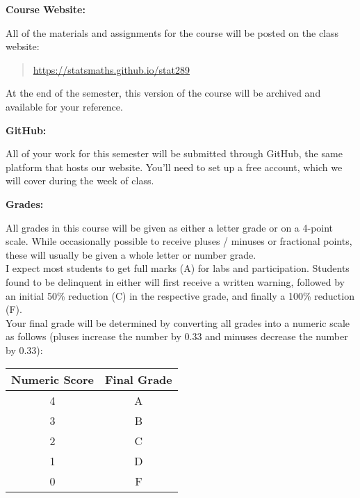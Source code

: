 \documentclass[12pt]{article}
\begin{document}
\vspace{0.4cm}

\textbf{Course Website:} \vspace{6pt}

All of the materials and assignments for the course will be posted
on the class website:
\begin{quote}
\url{https://statsmaths.github.io/stat289}
\end{quote}
At the end of the semester, this version of the course
will be archived and available for your reference.

\newpage

\vspace{0.4cm}

\textbf{GitHub:} \vspace{6pt}

All of your work for this semester will be submitted through GitHub,
the same platform that hosts our website. You'll need to set up a free
account, which we will cover during the week of class.

\vspace{0.4cm}

\textbf{Grades:} \vspace{6pt}

All grades in this course will be given as either a letter grade
or on a 4-point scale.
While occasionally possible to receive pluses / minuses or
fractional points, these will usually be given a whole letter or
number grade. \\

I expect most students to get full marks (A) for labs and participation.
Students found to be delinquent in either will first receive a written
warning, followed by an initial 50\% reduction (C) in the respective grade,
and finally a 100\% reduction (F). \\

Your final grade will be determined by converting all grades into
a numeric scale as follows (pluses increase the number by 0.33 and minuses
decrease the number by 0.33):

\begin{center}
\begin{tabular}{c || c}
Numeric Score & Final Grade \\
\hline \hline
4 & A  \\
3 & B  \\
2 & C  \\
1 & D  \\
0 & F
\end{tabular}
\end{center}
\end{document}
